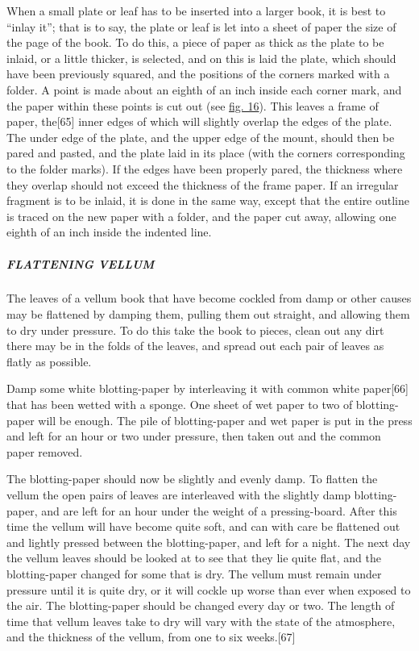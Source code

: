 \documentclass[
]{article}
\begin{document}
When a small plate or leaf has to be inserted into a larger book, it is
best to ``inlay it''; that is to say, the plate or leaf is let into a
sheet of paper the size of the page of the book. To do this, a piece of
paper as thick as the plate to be inlaid, or a little thicker, is
selected, and on this is laid the plate, which should have been
previously squared, and the positions of the corners marked with a
folder. A point is made about an eighth of an inch inside each corner
mark, and the paper within these points is cut out (see
\protect\hyperlink{Fig_16}{fig. 16}). This leaves a frame of paper,
the{\protect\hypertarget{Page_65}{}{{[}65{]}}} inner edges of which will
slightly overlap the edges of the plate. The under edge of the plate,
and the upper edge of the mount, should then be pared and pasted, and
the plate laid in its place (with the corners corresponding to the
folder marks). If the edges have been properly pared, the thickness
where they overlap should not exceed the thickness of the frame paper.
If an irregular fragment is to be inlaid, it is done in the same way,
except that the entire outline is traced on the new paper with a folder,
and the paper cut away, allowing one eighth of an inch inside the
indented line.

\hypertarget{flattening-vellum}{%
\subparagraph{FLATTENING VELLUM}\label{flattening-vellum}}

The leaves of a vellum book that have become cockled from damp or other
causes may be flattened by damping them, pulling them out straight, and
allowing them to dry under pressure. To do this take the book to pieces,
clean out any dirt there may be in the folds of the leaves, and spread
out each pair of leaves as flatly as possible.

Damp some white blotting-paper by interleaving it with common white
paper{\protect\hypertarget{Page_66}{}{{[}66{]}}} that has been wetted
with a sponge. One sheet of wet paper to two of blotting-paper will be
enough. The pile of blotting-paper and wet paper is put in the press and
left for an hour or two under pressure, then taken out and the common
paper removed.

The blotting-paper should now be slightly and evenly damp. To flatten
the vellum the open pairs of leaves are interleaved with the slightly
damp blotting-paper, and are left for an hour under the weight of a
pressing-board. After this time the vellum will have become quite soft,
and can with care be flattened out and lightly pressed between the
blotting-paper, and left for a night. The next day the vellum leaves
should be looked at to see that they lie quite flat, and the
blotting-paper changed for some that is dry. The vellum must remain
under pressure until it is quite dry, or it will cockle up worse than
ever when exposed to the air. The blotting-paper should be changed every
day or two. The length of time that vellum leaves take to dry will vary
with the state of the atmosphere, and the thickness of the vellum, from
one to six weeks.{\protect\hypertarget{Page_67}{}{{[}67{]}}}
\end{document}
